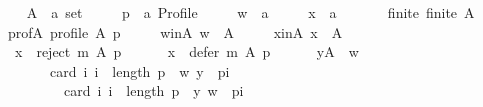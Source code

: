 \begin{isabellebody}
\isamarkupfalse%
\isanewline
\ \ \isamarkupfalse%
\isanewline
\ \ \ \ A\ {\isacharcolon}{\kern0pt}{\isacharcolon}{\kern0pt}\ {\isachardoublequoteopen}{\isacharprime}{\kern0pt}a\ set{\isachardoublequoteclose}\ \isanewline
\ \ \ \ p\ {\isacharcolon}{\kern0pt}{\isacharcolon}{\kern0pt}\ {\isachardoublequoteopen}{\isacharprime}{\kern0pt}a\ Profile{\isachardoublequoteclose}\ \isanewline
\ \ \ \ w\ {\isacharcolon}{\kern0pt}{\isacharcolon}{\kern0pt}\ {\isachardoublequoteopen}{\isacharprime}{\kern0pt}a{\isachardoublequoteclose}\ \isanewline
\ \ \ \ x\ {\isacharcolon}{\kern0pt}{\isacharcolon}{\kern0pt}\ {\isachardoublequoteopen}{\isacharprime}{\kern0pt}a{\isachardoublequoteclose}\isanewline
\ \ \isamarkupfalse%
\isanewline
\ \ \ \ finite{\isacharcolon}{\kern0pt}\ {\isachardoublequoteopen}finite\ A{\isachardoublequoteclose}\ \isanewline
\ \ \ \ prof{\isacharunderscore}{\kern0pt}A{\isacharcolon}{\kern0pt}\ {\isachardoublequoteopen}profile\ A\ p{\isachardoublequoteclose}\ \isanewline
\ \ \ \ w{\isacharunderscore}{\kern0pt}in{\isacharunderscore}{\kern0pt}A{\isacharcolon}{\kern0pt}\ {\isachardoublequoteopen}w\ {\isasymin}\ A{\isachardoublequoteclose}\ \isanewline
\ \ \ \ x{\isacharunderscore}{\kern0pt}in{\isacharunderscore}{\kern0pt}A{\isacharcolon}{\kern0pt}\ {\isachardoublequoteopen}x\ {\isasymin}\ A{\isachardoublequoteclose}\ \isanewline
\ \ \ \ {}{\isacharcolon}{\kern0pt}\ {\isachardoublequoteopen}x\ {\isasymnotin}\ reject\ m\ A\ p{\isachardoublequoteclose}\ \isanewline
\ \ \ \ {}{\isacharcolon}{\kern0pt}\ {\isachardoublequoteopen}x\ {\isasymnotin}\ defer\ m\ A\ p{\isachardoublequoteclose}\ \isanewline
\ \ \ \ {}{\isacharcolon}{\kern0pt}\ {\isachardoublequoteopen}{\isasymforall}y{\isasymin}A\ {\isacharminus}{\kern0pt}\ {\isacharbraceleft}{\kern0pt}w{\isacharbraceright}{\kern0pt}{\isachardot}{\kern0pt}\isanewline
\ \ \ \ \ \ \ \ \ \ card\ {\isacharbraceleft}{\kern0pt}i{\isachardot}{\kern0pt}\ i\ {\isacharless}{\kern0pt}\ length\ p\ {\isasymand}\ {\isacharparenleft}{\kern0pt}w{\isacharcomma}{\kern0pt}\ y{\isacharparenright}{\kern0pt}\ {\isasymin}\ {\isacharparenleft}{\kern0pt}p{\isacharbang}{\kern0pt}i{\isacharparenright}{\kern0pt}{\isacharbraceright}{\kern0pt}\ {\isacharless}{\kern0pt}\isanewline
\ \ \ \ \ \ \ \ \ \ \ \ card\ {\isacharbraceleft}{\kern0pt}i{\isachardot}{\kern0pt}\ i\ {\isacharless}{\kern0pt}\ length\ p\ {\isasymand}\ {\isacharparenleft}{\kern0pt}y{\isacharcomma}{\kern0pt}\ w{\isacharparenright}{\kern0pt}\ {\isasymin}\ {\isacharparenleft}{\kern0pt}p{\isacharbang}{\kern0pt}i{\isacharparenright}{\kern0pt}{\isacharbraceright}{\kern0pt}{\isachardoublequoteclose}\isanewline

\end{isabellebody}
